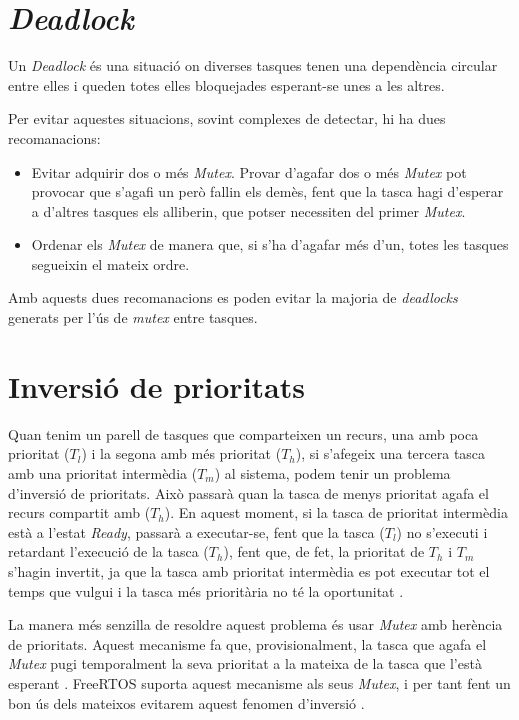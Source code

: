 \section{\em Deadlock}
Un {\em Deadlock} és una situació on diverses tasques tenen una dependència circular entre elles i queden totes elles bloquejades esperant-se unes a les altres.

Per evitar aquestes situacions, sovint complexes de detectar, hi ha dues recomanacions:
\begin{itemize}
 \item Evitar adquirir dos o més {\em Mutex}. Provar d'agafar dos o més {\em Mutex} pot provocar que s'agafi un però fallin els demès, fent que la tasca hagi d'esperar a d'altres tasques els alliberin, que potser necessiten del primer {\em Mutex}.
 \item Ordenar els {\em Mutex} de manera que, si s'ha d'agafar més d'un, totes les tasques segueixin el mateix ordre.
\end{itemize}

Amb aquests dues recomanacions es poden evitar la majoria de {\em deadlocks} generats per l'ús de {\em mutex} entre tasques.

\section{Inversió de prioritats}
\label{sec:priorityinv}
Quan tenim un parell de tasques que comparteixen un recurs, una amb poca prioritat ($T_l$) i la segona amb més prioritat ($T_h$), si s'afegeix una tercera tasca amb una prioritat intermèdia ($T_m$) al sistema, podem tenir un problema d'inversió de prioritats. Això passarà quan la tasca de menys prioritat agafa el recurs compartit amb ($T_h$). En aquest moment, si la tasca de prioritat intermèdia està a l'estat {\em Ready}, passarà a executar-se, fent que la tasca ($T_l$) no s'executi i retardant l'execució de la tasca ($T_h$), fent que, de fet, la prioritat de $T_h$ i $T_m$ s'hagin invertit, ja que la tasca amb prioritat intermèdia es pot executar tot el temps que vulgui i la tasca més prioritària no té la oportunitat \cite[101]{RTEmbeddedSystems}.

La manera més senzilla de resoldre aquest problema és usar {\em Mutex} amb herència de prioritats. Aquest mecanisme fa que, provisionalment, la tasca que agafa el {\em Mutex} pugi temporalment la seva prioritat a la mateixa de la tasca que l'està esperant \cite[106]{RTEmbeddedSystems}. FreeRTOS suporta aquest mecanisme als seus {\em Mutex}, i per tant fent un bon ús dels mateixos evitarem aquest fenomen d'inversió \cite[251]{FreeRTOSBook}.

